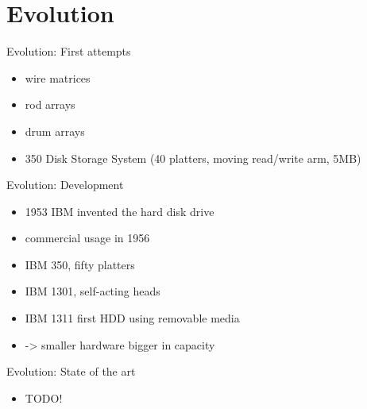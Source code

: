 \documentclass[12pt]{beamer}
\newlength{\wideitemsep}
\let\olditem\item
\renewcommand{\item}{\setlength{\itemsep}{\wideitemsep}\olditem}
\begin{document}
\section{Evolution}
\begin{frame}[fragile]{Evolution: First attempts}
	\begin{itemize}
		\item wire matrices
		\item rod arrays
		\item drum arrays
		\item 350 Disk Storage System (40 platters, moving read/write arm, 5MB)
	\end{itemize}
\end{frame}

\begin{frame}[fragile]{Evolution: Development}
	\begin{itemize}
		\item 1953 IBM invented the hard disk drive
		\item commercial usage in 1956
		\item IBM 350, fifty platters
		\item IBM 1301, self-acting heads
		\item IBM 1311 first HDD using removable media
		\item -> smaller hardware bigger in capacity
	\end{itemize}
\end{frame}


\begin{frame}[fragile]{Evolution: State of the art}
	\begin{itemize}
		\item TODO!
	\end{itemize}
\end{frame}
\end{document}
